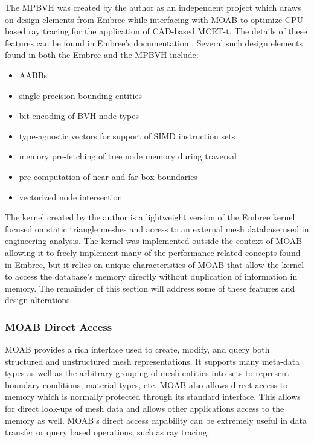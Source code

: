 The MPBVH was created by the author as an independent project which draws on
design elements from Embree while interfacing with MOAB to optimize CPU-based
ray tracing for the application of CAD-based MCRT-t. The details of these
features can be found in Embree's documentation \cite{Embree}. Several such
design elements found in both the Embree and the MPBVH include:

\begin{itemize}
  \item AABBs
  \item single-precision bounding entities
  \item bit-encoding of BVH node types
  \item type-agnostic vectors for support of SIMD instruction sets
  \item memory pre-fetching of tree node memory during traversal
  \item pre-computation of near and far box boundaries
  \item vectorized node intersection
\end{itemize}

The kernel created by the author is a lightweight version of the Embree kernel
focused on static triangle meshes and access to an external mesh database used
in engineering analysis. The kernel was implemented outside the context of MOAB
allowing it to freely implement many of the performance related concepts found
in Embree, but it relies on unique characteristics of MOAB that allow the kernel
to access the database's memory directly without duplication of information in
memory. The remainder of this section will address some
of these features and design alterations.

\subsubsection{MOAB Direct Access}\label{sec:direct_access}

MOAB provides a rich interface used to create, modify, and query both structured
and unstructured mesh representations. It supports many meta-data types as well
as the arbitrary grouping of mesh entities into sets to represent boundary
conditions, material types, etc. MOAB also allows direct access to memory which
is normally protected through its standard interface. This allows for direct
look-ups of mesh data and allows other applications access to the memory as
well. MOAB's direct access capability can be extremely useful in data transfer
or query based operations, such as ray tracing.

